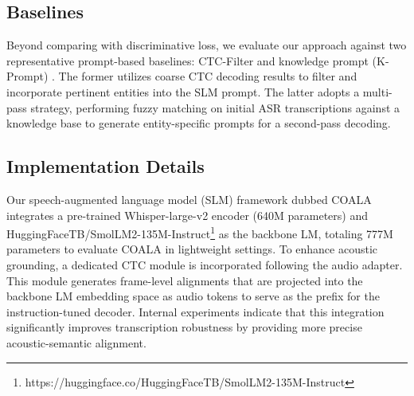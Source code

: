 \documentclass[cameraready]{Interspeech}
\begin{document}
\subsection{Baselines}
Beyond comparing with discriminative loss, we evaluate our approach against two representative prompt-based baselines: CTC-Filter \cite{yang2024ctc} and knowledge prompt (K-Prompt) \cite{zhang2023knowledgepromptforwhisper}.
%
The former utilizes coarse CTC decoding results to filter and incorporate pertinent entities into the SLM prompt.
%
The latter adopts a multi-pass strategy, performing fuzzy matching on initial ASR transcriptions against a knowledge base to generate entity-specific prompts for a second-pass decoding.


\subsection{Implementation Details}
Our speech-augmented language model (SLM) framework dubbed COALA integrates a pre-trained Whisper-large-v2 encoder \cite{whisper2023robust} (640M parameters) and HuggingFaceTB/SmolLM2-135M-Instruct\footnote{https://huggingface.co/HuggingFaceTB/SmolLM2-135M-Instruct} as the backbone LM, totaling 777M parameters to evaluate COALA in lightweight settings.
%
To enhance acoustic grounding, a dedicated CTC module is incorporated following the audio adapter.
%
This module generates frame-level alignments that are projected into the backbone LM embedding space as audio tokens to serve as the prefix for the instruction-tuned decoder.
%
Internal experiments indicate that this integration significantly improves transcription robustness by providing more precise acoustic-semantic alignment.
\end{document}
